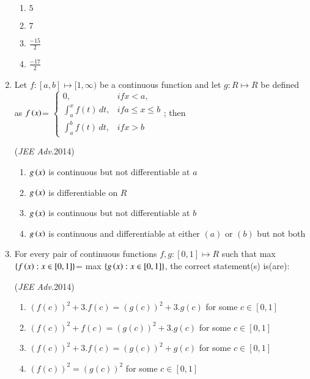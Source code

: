 \documentclass[journal,12pt,twocolumn]{IEEEtran}
\theoremstyle{remark}
\begin{document}
\begin{enumerate}
\begin{flushleft}
\begin{enumerate}
        \item $5$
        \item $7$
        \item $\frac{-15}{2}$
        \item $\frac{-17}{2}$
    \end{enumerate}
\end{flushleft}

    \item
\begin{flushleft}
   
    {Let $f: [a,b]\mapsto [1,\infty)$ be a continuous function and let $g: R\mapsto R$ be defined as
    $f\left(x\right)$=
    $\begin{cases}
       0, & if x<a, \\
       \displaystyle \int_{a}^{x}{f(t) \, dt}, & if a\leq x\leq b \\
       \displaystyle \int_{a}^{b}{f(t) \, dt}, & if x>b
    \end{cases}$; then}

    \hfill
    {(\textit{JEE Adv.}2014)}
   
    \begin{enumerate}[label=(\alph*)]
       
        \item $g\left(x\right)$ is continuous but not differentiable at $a$
        \item $g\left(x\right)$ is differentiable on $R$
        \item $g\left(x\right)$ is continuous but not differentiable at $b$
        \item $g\left(x\right)$ is continuous and differentiable at either $(a)$ or $(b)$ but not both
    \end{enumerate}
\end{flushleft}

    \item
\begin{flushleft}
   
    {For every pair of continuous functions $f, g: [0, 1]\mapsto R$ such that max $\{f\left(x\right): x\in [0, 1]\}$= max $\{g\left(x\right): x\in [0, 1]\}$, the correct statement(s) is(are):}
   
    \hfill
    {(\textit{JEE Adv.}2014)}
   
    \begin{enumerate}[label=(\alph*)]
       
        \item $(f(c))^2+3.f(c)=(g(c))^2+3.g(c)$ for some $c\in [0,1]$
        \item $(f(c))^2+f(c)=(g(c))^2+3.g(c)$ for some $c\in [0,1]$
        \item $(f(c))^2+3.f(c)=(g(c))^2+g(c)$ for some $c\in [0,1]$
        \item $(f(c))^2=(g(c))^2$ for some $c\in [0,1]$
    \end{enumerate}
\end{flushleft}


\end{enumerate}
\end{document}
